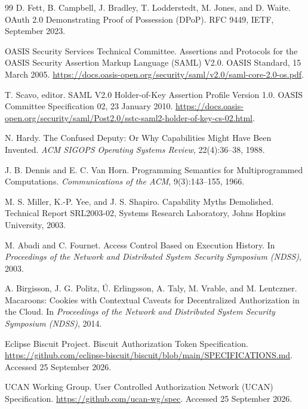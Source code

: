 \documentclass[10pt,twocolumn]{article}
\begin{document}
\begin{thebibliography}{99}
D. Fett, B. Campbell, J. Bradley, T. Lodderstedt, M. Jones, and D. Waite.
\newblock OAuth 2.0 Demonstrating Proof of Possession (DPoP).
\newblock RFC 9449, IETF, September 2023.

OASIS Security Services Technical Committee.
\newblock Assertions and Protocols for the OASIS Security Assertion Markup
Language (SAML) V2.0.
\newblock OASIS Standard, 15 March 2005.
\newblock \url{https://docs.oasis-open.org/security/saml/v2.0/saml-core-2.0-os.pdf}.

T. Scavo, editor.
\newblock SAML V2.0 Holder-of-Key Assertion Profile Version 1.0.
\newblock OASIS Committee Specification 02, 23 January 2010.
\newblock
\url{https://docs.oasis-open.org/security/saml/Post2.0/sstc-saml2-holder-of-key-cs-02.html}.

N. Hardy.
\newblock The Confused Deputy: Or Why Capabilities Might Have Been Invented.
\newblock \emph{ACM SIGOPS Operating Systems Review}, 22(4):36--38, 1988.

J. B. Dennis and E. C. Van Horn.
\newblock Programming Semantics for Multiprogrammed Computations.
\newblock \emph{Communications of the ACM}, 9(3):143--155, 1966.

M. S. Miller, K.-P. Yee, and J. S. Shapiro.
\newblock Capability Myths Demolished.
\newblock Technical Report SRL2003-02, Systems Research Laboratory,
Johns Hopkins University, 2003.

M. Abadi and C. Fournet.
\newblock Access Control Based on Execution History.
\newblock In \emph{Proceedings of the Network and Distributed System Security
Symposium (NDSS)}, 2003.

A. Birgisson, J. G. Politz, \'U. Erlingsson, A. Taly, M. Vrable, and M. Lentczner.
\newblock Macaroons: Cookies with Contextual Caveats for Decentralized
Authorization in the Cloud.
\newblock In \emph{Proceedings of the Network and Distributed System Security
Symposium (NDSS)}, 2014.

Eclipse Biscuit Project.
\newblock Biscuit Authorization Token Specification.
\newblock \url{https://github.com/eclipse-biscuit/biscuit/blob/main/SPECIFICATIONS.md}.
\newblock Accessed 25 September 2026.

UCAN Working Group.
\newblock User Controlled Authorization Network (UCAN) Specification.
\newblock \url{https://github.com/ucan-wg/spec}.
\newblock Accessed 25 September 2026.


\end{thebibliography}
\end{document}
